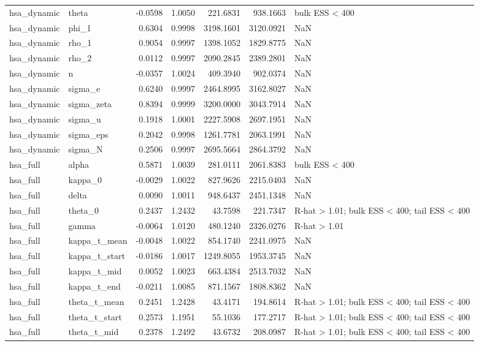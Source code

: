 \begin{tabular}{llrrrrl}
hsa\_dynamic & theta & -0.0598 & 1.0050 & 221.6831 & 938.1663 & bulk ESS < 400 \\
hsa\_dynamic & phi\_1 & 0.6304 & 0.9998 & 3198.1601 & 3120.0921 & NaN \\
hsa\_dynamic & rho\_1 & 0.9054 & 0.9997 & 1398.1052 & 1829.8775 & NaN \\
hsa\_dynamic & rho\_2 & 0.0112 & 0.9997 & 2090.2845 & 2389.2801 & NaN \\
hsa\_dynamic & n & -0.0357 & 1.0024 & 409.3940 & 902.0374 & NaN \\
hsa\_dynamic & sigma\_e & 0.6240 & 0.9997 & 2464.8995 & 3162.8027 & NaN \\
hsa\_dynamic & sigma\_zeta & 0.8394 & 0.9999 & 3200.0000 & 3043.7914 & NaN \\
hsa\_dynamic & sigma\_u & 0.1918 & 1.0001 & 2227.5908 & 2697.1951 & NaN \\
hsa\_dynamic & sigma\_eps & 0.2042 & 0.9998 & 1261.7781 & 2063.1991 & NaN \\
hsa\_dynamic & sigma\_N & 0.2506 & 0.9997 & 2695.5664 & 2864.3792 & NaN \\
hsa\_full & alpha & 0.5871 & 1.0039 & 281.0111 & 2061.8383 & bulk ESS < 400 \\
hsa\_full & kappa\_0 & -0.0029 & 1.0022 & 827.9626 & 2215.0403 & NaN \\
hsa\_full & delta & 0.0090 & 1.0011 & 948.6437 & 2451.1348 & NaN \\
hsa\_full & theta\_0 & 0.2437 & 1.2432 & 43.7598 & 221.7347 & R-hat > 1.01; bulk ESS < 400; tail ESS < 400 \\
hsa\_full & gamma & -0.0064 & 1.0120 & 480.1240 & 2326.0276 & R-hat > 1.01 \\
hsa\_full & kappa\_t\_mean & -0.0048 & 1.0022 & 854.1740 & 2241.0975 & NaN \\
hsa\_full & kappa\_t\_start & -0.0186 & 1.0017 & 1249.8055 & 1953.3745 & NaN \\
hsa\_full & kappa\_t\_mid & 0.0052 & 1.0023 & 663.4384 & 2513.7032 & NaN \\
hsa\_full & kappa\_t\_end & -0.0211 & 1.0085 & 871.1567 & 1808.8362 & NaN \\
hsa\_full & theta\_t\_mean & 0.2451 & 1.2428 & 43.4171 & 194.8614 & R-hat > 1.01; bulk ESS < 400; tail ESS < 400 \\
hsa\_full & theta\_t\_start & 0.2573 & 1.1951 & 55.1036 & 177.2717 & R-hat > 1.01; bulk ESS < 400; tail ESS < 400 \\
hsa\_full & theta\_t\_mid & 0.2378 & 1.2492 & 43.6732 & 208.0987 & R-hat > 1.01; bulk ESS < 400; tail ESS < 400 \\

\end{tabular}
